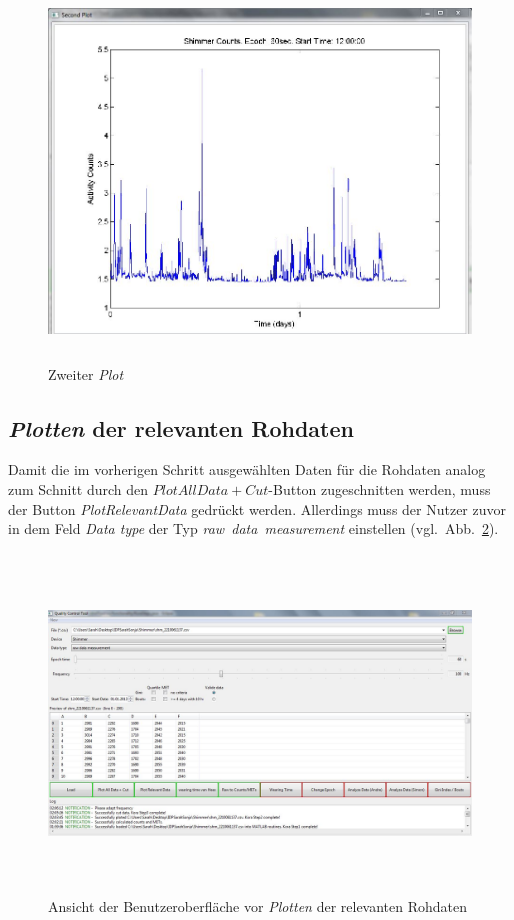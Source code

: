 \documentclass[onecolumn,german]{article}
\begin{document}
\begin{figure}[H]
\centerline{
\includegraphics[width=125mm, height=100mm]{Abbildungen/SecondPlot.JPG}
}
\caption {Zweiter \textit{Plot}}
\label{secondPlot}
\end{figure}
\newpage
\subsection{\textit{Plotten} der relevanten Rohdaten}

Damit die im vorherigen Schritt ausgewählten Daten für die Rohdaten analog zum Schnitt durch den \mbox{\textit{$PlotAllData + Cut$}-Button} zugeschnitten werden, muss der Button \textit{PlotRelevantData} gedrückt werden. Allerdings muss der Nutzer zuvor in dem Feld \textit{Data type} der Typ \mbox{\textit{raw data measurement}} einstellen \mbox{(vgl. Abb. \ref{cut})}.

\begin{figure}[H]
\centerline{
\includegraphics[width=160mm, height=90mm]{Abbildungen/Cut.JPG}
}
\caption {Ansicht der Benutzeroberfläche vor \textit{Plotten} der relevanten Rohdaten}
\label{cut}
\end{figure}
\end{document}
